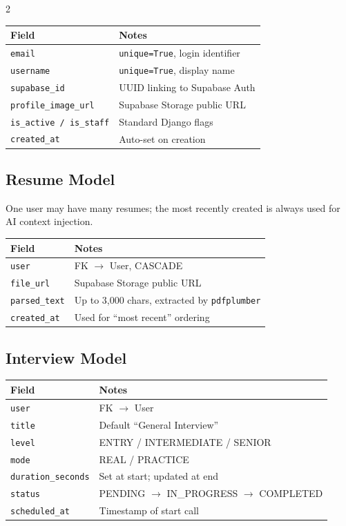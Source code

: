 \documentclass[10pt, a4paper]{article}
\begin{document}
\begin{multicols}{2}
\begin{center}
\small
\begin{tabular}{@{}ll@{}}
\toprule
Field & Notes \\
\midrule
\texttt{email} & \texttt{unique=True}, login identifier \\
\texttt{username} & \texttt{unique=True}, display name \\
\texttt{supabase\_id} & UUID linking to Supabase Auth \\
\texttt{profile\_image\_url} & Supabase Storage public URL \\
\texttt{is\_active / is\_staff} & Standard Django flags \\
\texttt{created\_at} & Auto-set on creation \\
\bottomrule
\end{tabular}
\end{center}

\subsection{Resume Model}
One user may have many resumes; the most recently created is always used
for AI context injection.

\begin{center}
\small
\begin{tabular}{@{}ll@{}}
\toprule
Field & Notes \\
\midrule
\texttt{user} & FK $\to$ User, CASCADE \\
\texttt{file\_url} & Supabase Storage public URL \\
\texttt{parsed\_text} & Up to 3,000 chars, extracted by \texttt{pdfplumber} \\
\texttt{created\_at} & Used for ``most recent'' ordering \\
\bottomrule
\end{tabular}
\end{center}

\subsection{Interview Model}
\begin{center}
\small
\begin{tabular}{@{}ll@{}}
\toprule
Field & Notes \\
\midrule
\texttt{user} & FK $\to$ User \\
\texttt{title} & Default ``General Interview'' \\
\texttt{level} & ENTRY / INTERMEDIATE / SENIOR \\
\texttt{mode} & REAL / PRACTICE \\
\texttt{duration\_seconds} & Set at start; updated at end \\
\texttt{status} & PENDING $\to$ IN\_PROGRESS $\to$ COMPLETED \\
\texttt{scheduled\_at} & Timestamp of start call \\
\bottomrule
\end{tabular}
\end{center}


\end{multicols}
\end{document}

